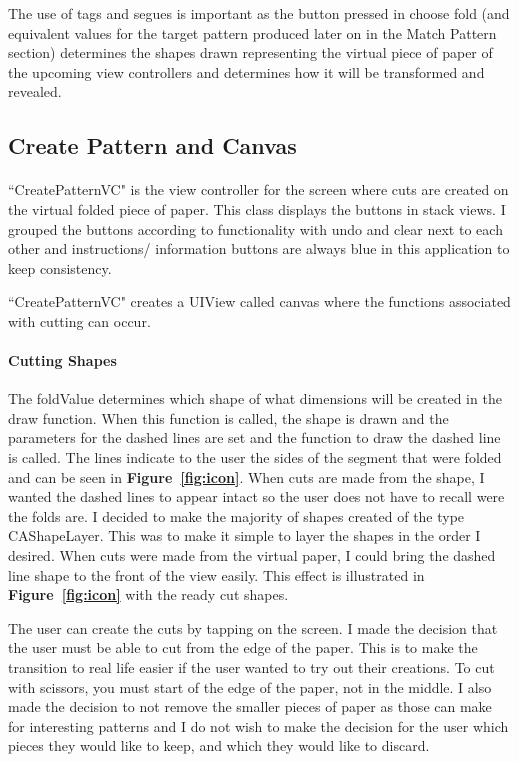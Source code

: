 \documentclass[11pt]{article}
\begin{document}
            The use of tags and segues is important as the button pressed in choose fold (and equivalent values for the target pattern produced later on in the Match Pattern section) determines the shapes drawn representing the virtual piece of paper of the upcoming view controllers and determines how it will be transformed and revealed.
            
                
            \subsection{Create Pattern and Canvas}
                \paragraph{}
                ``CreatePatternVC" is the view controller for the screen where cuts are created on the virtual folded piece of paper. This class displays the buttons in stack views. I grouped the buttons according to functionality with undo and clear next to each other and instructions/ information buttons are always blue in this application to keep consistency. 
                
                ``CreatePatternVC" creates a UIView called canvas where the functions associated with cutting can occur.
                    
                 \paragraph{Cutting Shapes}
                 The foldValue determines which shape of what dimensions will be created in the draw function. When this function is called, the shape is drawn and the parameters for the dashed lines are set and the function to draw the dashed line is called. The lines indicate to the user the sides of the segment that were folded and can be seen in \textbf{Figure~\ref{fig:icon}}.
                 When cuts are made from the shape, I wanted the dashed lines to appear intact so the user does not have to recall were the folds are. I decided to make the majority of shapes created of the type CAShapeLayer. This was to make it simple to layer the shapes in the order I desired. When cuts were made from the virtual paper, I could bring the dashed line shape to the front of the view easily. This effect is illustrated in \textbf{Figure~\ref{fig:icon}} with the ready cut shapes.
                 
                 The user can create the cuts by tapping on the screen. I made the decision that the user must be able to cut from the edge of the paper. This is to make the transition to real life easier if the user wanted to try out their creations. To cut with scissors, you must start of the edge of the paper, not in the middle. I also made the decision to not remove the smaller pieces of paper as those can make for interesting patterns and I do not wish to make the decision for the user which pieces they would like to keep, and which they would like to discard.
                 
\end{document}
